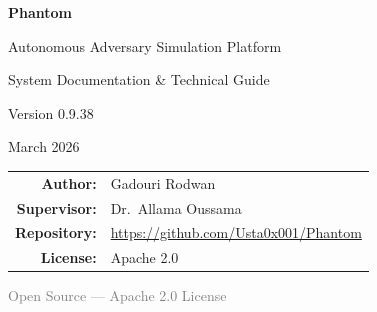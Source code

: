 \documentclass[11pt,a4paper]{article}
\begin{document}
\begin{titlepage}
\centering
\vspace*{2cm}
{\Huge\bfseries\textcolor{phantomblue}{Phantom}\par}
\vspace{0.5cm}
{\LARGE Autonomous Adversary Simulation Platform\par}
\vspace{0.3cm}
{\large System Documentation \& Technical Guide\par}
\vspace{1.5cm}
{\Large Version 0.9.38\par}
\vspace{0.5cm}
{\large March 2026\par}
\vspace{3cm}
\begin{tabular}{rl}
\textbf{Author:}      & Gadouri Rodwan \\[4pt]
\textbf{Supervisor:}   & Dr.\ Allama Oussama \\[4pt]
\textbf{Repository:}   & \url{https://github.com/Usta0x001/Phantom} \\[4pt]
\textbf{License:}      & Apache 2.0 \\
\end{tabular}
\vfill
{\small\textcolor{gray}{Open Source --- Apache 2.0 License}}
\end{titlepage}

\begin{abstract}
\noindent
Phantom is an AI-powered autonomous penetration testing platform that leverages
Large Language Models (LLMs) to discover, exploit, and verify real-world
vulnerabilities in web applications, APIs, and network services --- entirely
without human intervention. Unlike signature-based scanners that match known
patterns, Phantom employs a \textbf{ReAct} (Reason + Act) agent loop that reads HTTP
responses, reasons about attack surfaces, chains multi-step exploits, and
produces working proof-of-concept code.

This document serves as the \textbf{complete technical documentation and user guide}
for the Phantom system. It covers architecture, design philosophy, implementation
details, security controls, scanning workflows, LLM integration, the full tool
ecosystem, quality assurance, and deployment instructions.

\medskip\noindent
\textbf{Key result:} Against the OWASP Juice Shop benchmark (100+ known vulns),
Phantom v0.9.38 discovered 7 vulnerabilities (5~Critical, 2~High) in 26
iterations over 15 minutes at a cost of \$0.36.
\end{abstract}
\end{document}
